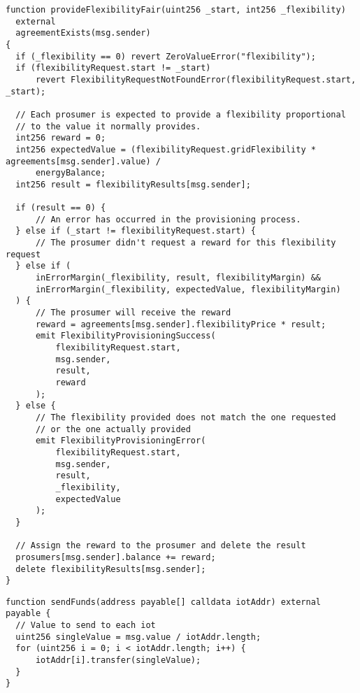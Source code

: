 \begin{verbatim}
function provideFlexibilityFair(uint256 _start, int256 _flexibility)
  external
  agreementExists(msg.sender)
{
  if (_flexibility == 0) revert ZeroValueError("flexibility");
  if (flexibilityRequest.start != _start)
      revert FlexibilityRequestNotFoundError(flexibilityRequest.start, _start);

  // Each prosumer is expected to provide a flexibility proportional
  // to the value it normally provides.
  int256 reward = 0;
  int256 expectedValue = (flexibilityRequest.gridFlexibility * agreements[msg.sender].value) /
      energyBalance;
  int256 result = flexibilityResults[msg.sender];

  if (result == 0) {
      // An error has occurred in the provisioning process.
  } else if (_start != flexibilityRequest.start) {
      // The prosumer didn't request a reward for this flexibility request
  } else if (
      inErrorMargin(_flexibility, result, flexibilityMargin) &&
      inErrorMargin(_flexibility, expectedValue, flexibilityMargin)
  ) {
      // The prosumer will receive the reward
      reward = agreements[msg.sender].flexibilityPrice * result;
      emit FlexibilityProvisioningSuccess(
          flexibilityRequest.start,
          msg.sender,
          result,
          reward
      );
  } else {
      // The flexibility provided does not match the one requested
      // or the one actually provided
      emit FlexibilityProvisioningError(
          flexibilityRequest.start,
          msg.sender,
          result,
          _flexibility,
          expectedValue
      );
  }

  // Assign the reward to the prosumer and delete the result
  prosumers[msg.sender].balance += reward;
  delete flexibilityResults[msg.sender];
}
\end{verbatim}

\begin{verbatim}
function sendFunds(address payable[] calldata iotAddr) external payable {
  // Value to send to each iot
  uint256 singleValue = msg.value / iotAddr.length;
  for (uint256 i = 0; i < iotAddr.length; i++) {
      iotAddr[i].transfer(singleValue);
  }
}
\end{verbatim}

